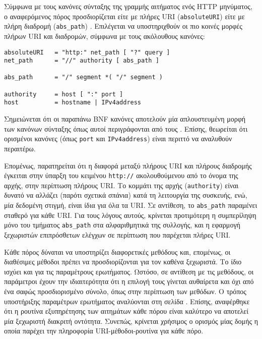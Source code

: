 Σύμφωνα με τους κανόνες σύνταξης της γραμμής αιτήματος ενός HTTP μηνύματος, ο
αναφερόμενος πόρος προσδιορίζεται είτε με πλήρες URI (\verb~absoluteURI~) είτε
με πλήρη διαδρομή (\verb~abs_path~) \parencite[36--37]{rfc2616}.
Επιλέγεται να υποστηριχθούν οι πιο κοινές μορφές πλήρων URI και διαδρομών,
σύμφωνα με τους ακόλουθους κανόνες:
\begin{lstlisting}
absoluteURI   = "http:" net_path [ "?" query ]
net_path      = "//" authority [ abs_path ]

abs_path      = "/" segment *( "/" segment )

authority     = host [ ":" port ]
host          = hostname | IPv4address
\end{lstlisting}
Σημειώνεται ότι οι παραπάνω BNF κανόνες αποτελούν μία απλουστευμένη μορφή των
κανόνων σύνταξης όπως αυτοί περιγράφονται από τους \textcite[27--28]{rfc2396}.
Επίσης, θεωρείται ότι ορισμένοι κανόνες (όπως \verb~port~ και 
\verb~IPv4address~) είναι περιττό να αναλυθούν περαιτέρω.

Επομένως, παρατηρείται ότι η διαφορά μεταξύ πλήρους URI και πλήρους διαδρομής
έγκειται στην ύπαρξη του κειμένου \verb~http://~ ακολουθούμενου από το όνομα της
αρχής, στην περίπτωση πλήρους URI. Το κομμάτι της αρχής (\verb~authority~) είναι
δυνατό να αλλάζει (παρότι σχετικά σπάνια) κατά τη λειτουργία της συσκευής, ενώ,
μία δεδομένη στιγμή, είναι ίδια για όλα τα URI. Σε αντίθεση, το \verb~abs_path~
παραμένει σταθερό για κάθε URI. Για τους λόγους αυτούς, κρίνεται προτιμότερη η
συμπερίληψη μόνο του τμήματος \verb~abs_path~ στα αλφαριθμητικά της συλλογής,
και η εφαρμογή ξεχωριστών επιπρόσθετων ελέγχων σε περίπτωση που παρέχεται πλήρες
URI.

Κάθε πόρος δύναται να υποστηρίζει διαφορετικές μεθόδους και, επομένως, οι
διαθέσιμες μέθοδοι πρέπει να προσδιορίζονται για τον καθένα ξεχωριστά. Το ίδιο
ισχύει και για τις παραμέτρους ερωτήματος. Ωστόσο, σε αντίθεση με τις μεθόδους,
οι παράμετροι έχουν την ιδιαιτερότητα ότι η επιλογή τους γίνεται αυθαίρετα και
όχι από ένα σαφώς προσδιορισμένο σύνολο, όπως στην περίπτωση των μεθόδων. Ο
τρόπος υποστήριξης παραμέτρων ερωτήματος αναλύονται στη σελίδα
\pageref{ssubsec:network:query-string}.
Επίσης, αναφέρθηκε ότι η ρουτίνα εξυπηρέτησης των αιτημάτων κάθε πόρου είναι
καλύτερο να αποτελεί μία ξεχωριστή διακριτή οντότητα. Συνεπώς, κρίνεται χρήσιμος
ο ορισμός μίας δομής η οποία παρέχει την πληροφορία URI-μέθοδοι-ρουτίνα για κάθε
πόρο.

